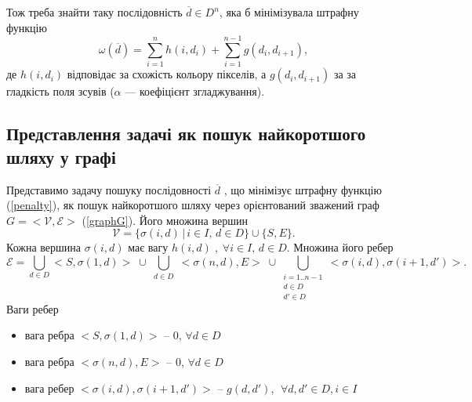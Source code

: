 Тож треба знайти таку послідовність $\overline{d} \in {D}^n$, яка б мінімізувала штрафну функцію
\begin{equation}
	\omega(\overline{d}) = \sum\limits_{i = 1}^n h(i, d_i) + \sum\limits_{i = 1}^{n-1} g(d_i, d_{i + 1}),
\end{equation}
\label{penalty}
де $ h(i, d_i) $ відповідає за схожість кольору пікселів, а $ g(d_i, d_{i + 1}) $ за за гладкість поля зсувів ($ \alpha $ --- коефіцієнт згладжування).


\subsection{Представлення задачі як пошук найкоротшого шляху у графі}\label{offline_graph}
Представимо задачу пошуку послідовності $ \overline{d} $ , що мінімізує штрафну функцію (\ref{penalty}), як пошук найкоротшого шляху через орієнтований зважений граф $G = <\mathcal{V}, \mathcal{E}>$ (\ref{graphG}).
Його множина вершин 
$$ \mathcal{V} = \{ \sigma(i, d) \, | \, i \in I, \, d \in D \} \cup \{ S, E \} .$$
Кожна вершина $\sigma(i, d)$ має вагу $h(i, d) \;, \; \forall i \in I, \, d \in D .$ Множина його ребер
$$ \mathcal{E} = \bigcup\limits_{d \in D }<S, \sigma(1, d) > \; \cup \bigcup\limits_{\substack{d \in D}} <\sigma(n, d), E > \; \cup 
\bigcup\limits_{\substack{i = 1..n-1 \\d \in D \\d' \in D}} <\sigma(i, d), \sigma(i+1, d') >.$$
Ваги ребер
\begin{itemize}
\item вага ребра $ < S,  \sigma(1, d) >$ -- $ 0 $, $ \forall d \in D $
\item вага ребра $ < \sigma(n, d), E >$ -- $ 0 $, $ \forall d \in D $
\item вага ребер $ < \sigma(i, d), \sigma(i + 1, d ') >$ -- $ g(d, d') $, $ \; \forall d, d' \in D, i \in I $
\end{itemize}

